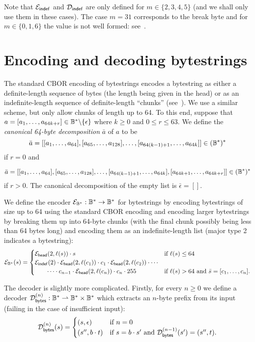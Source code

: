 \noindent Note that $\mathcal{E}_{\mathsf{indef}}$ and $\mathcal{D}_{\mathsf{indef}}$ are only defined for $m \in
\{2,3,4,5\}$ (and we shall only use them in these cases). The case $m=31$
corresponds to the break byte and for $m \in \{0,1,6\}$ the value is not well
formed: see~\cite[3.2.4]{rfc8949-CBOR}.

\section{Encoding and decoding bytestrings}
The standard CBOR encoding of bytestrings encodes a bytestring as either a
definite-length sequence of bytes (the length being given in the head) or as an
indefinite-length sequence of definite-length ``chunks'' (see~\cite[\S\S3.1 and
  3.4.2]{rfc8949-CBOR}).  We use a similar scheme, but only allow chunks of
length up to 64.  To this end, suppose that $a = [a_1, \ldots, a_{64k+r}] \in
\mathbb{B}^*\backslash\{\epsilon\}$ where $k \geq 0$ and $0 \leq r \leq 63$.  We define
the \textit{canonical 64-byte decomposition} $\bar{a}$ of $a$ to be
$$
\bar{a} = [[a_1, \ldots, a_{64}],
  [a_{65}, \ldots, a_{128}] ,\ldots, 
  [a_{64(k-1)+1}, \ldots, a_{64k}]] \in (\mathbb{B}^*)^*
$$
\noindent if $r=0$ and

$$
\bar{a} = [[a_1, \ldots, a_{64}],
  [a_{65}, \ldots, a_{128}], \ldots, 
  [a_{64(k-1)+1}, \ldots, a_{64k}], [a_{64k+1}, \ldots, a_{64k+r}]] \in (\mathbb{B}^*)^*
$$
\noindent if $r>0$.  The canonical decomposition of the empty list is $\bar{\epsilon} = []$.

\medskip
\noindent We define the encoder $\mathcal{E}_{\mathbb{B}^*}: \mathbb{B}^* \rightarrow \mathbb{B}^*$ for bytestrings by
encoding bytestrings of size up to 64 using the standard CBOR encoding and
encoding larger bytestrings by breaking them up into 64-byte chunks (with the
final chunk possibly being less than 64 bytes long) and encoding them as an
indefinite-length list (major type 2 indicates a bytestring):
$$ \mathcal{E}_{\mathbb{B}^*}(s) =
\begin{cases}
  \mathcal{E}_{\mathsf{head}}(2,\operatorname{\ell}(s)) \cdot s & \text{if $\operatorname{\ell}(s) \leq 64$}\\
  \mathcal{E}_{\mathsf{indef}}(2) \cdot \mathcal{E}_{\mathsf{head}}(2,\operatorname{\ell}(c_1)) \cdot c_1 \cdot \mathcal{E}_{\mathsf{head}}(2,\operatorname{\ell}(c_2)) \cdot \cdots \\
  \qquad  \cdots  \cdot c_{n-1} \cdot \mathcal{E}_{\mathsf{head}}(2,\operatorname{\ell}(c_n)) \cdot c_n \cdot 255
  & \text{if $\operatorname{\ell}(s) > 64$ and $\bar{s} = [c_1, \ldots, c_n]$.}
\end{cases}
$$

\medskip

\noindent The decoder is slightly more complicated.  Firstly, for every $n \geq
0$ we define a decoder $\mathcal{D}_{\mathsf{bytes}}^{(n)}: \mathbb{B}^* \rightharpoonup \mathbb{B}^* \times \mathbb{B}^*$
which extracts an $n$-byte prefix from its input (failing in the case of
insufficient input):
$$
\mathcal{D}_{\mathsf{bytes}}^{(n)}(s) =
\begin{cases}
  (s, \epsilon) & \text{if $n=0$}\\
  (s'', b \cdot t) & \text{if $s = b \cdot s'$ and $\mathcal{D}_{\mathsf{bytes}}^{(n-1)}(s') = (s'', t)$}.
\end{cases}
$$


